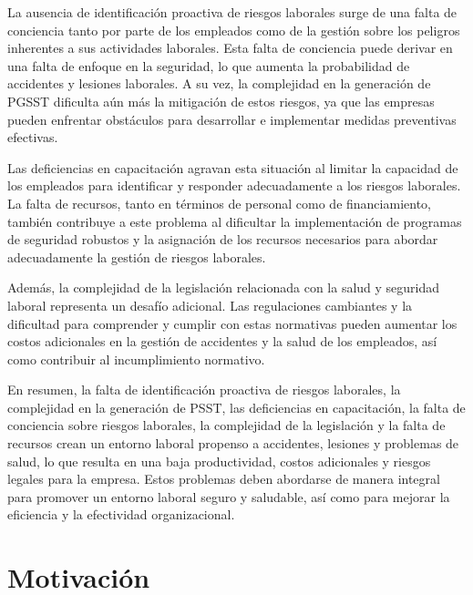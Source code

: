 La ausencia de identificación proactiva de riesgos laborales surge de una falta de conciencia tanto por parte de los empleados como de la gestión sobre los peligros inherentes a sus actividades laborales. Esta falta de conciencia puede derivar en una falta de enfoque en la seguridad, lo que aumenta la probabilidad de accidentes y lesiones laborales. A su vez, la complejidad en la generación de PGSST dificulta aún más la mitigación de estos riesgos, ya que las empresas pueden enfrentar obstáculos para desarrollar e implementar medidas preventivas efectivas.

Las deficiencias en capacitación agravan esta situación al limitar la capacidad de los empleados para identificar y responder adecuadamente a los riesgos laborales. La falta de recursos, tanto en términos de personal como de financiamiento, también contribuye a este problema al dificultar la implementación de programas de seguridad robustos y la asignación de los recursos necesarios para abordar adecuadamente la gestión de riesgos laborales.

Además, la complejidad de la legislación relacionada con la salud y seguridad laboral representa un desafío adicional. Las regulaciones cambiantes y la dificultad para comprender y cumplir con estas normativas pueden aumentar los costos adicionales en la gestión de accidentes y la salud de los empleados, así como contribuir al incumplimiento normativo.

En resumen, la falta de identificación proactiva de riesgos laborales, la complejidad en la generación de PSST, las deficiencias en capacitación, la falta de conciencia sobre riesgos laborales, la complejidad de la legislación y la falta de recursos crean un entorno laboral propenso a accidentes, lesiones y problemas de salud, lo que resulta en una baja productividad, costos adicionales y riesgos legales para la empresa. Estos problemas deben abordarse de manera integral para promover un entorno laboral seguro y saludable, así como para mejorar la eficiencia y la efectividad organizacional.


\section{Motivación}

